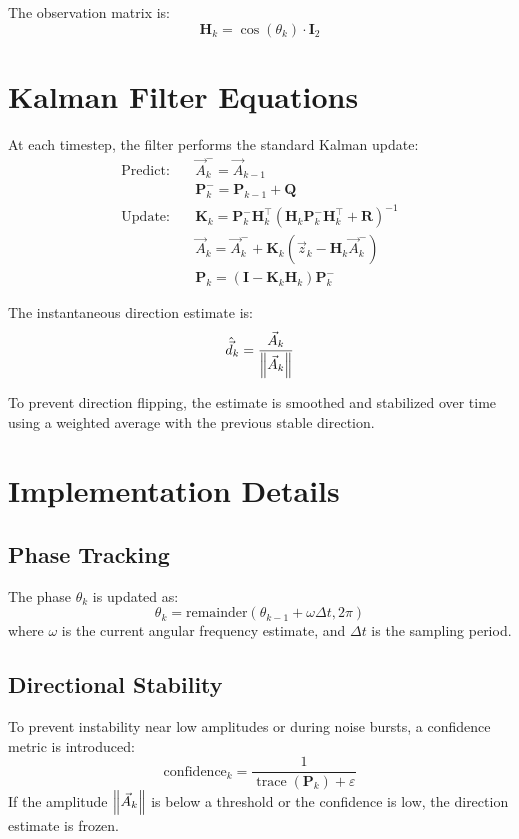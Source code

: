 \documentclass[12pt]{article}
\begin{document}
The observation matrix is:
\[
\mathbf{H}_k = \cos(\theta_k) \cdot \mathbf{I}_2
\]

\section{Kalman Filter Equations}

At each timestep, the filter performs the standard Kalman update:
\begin{align*}
\text{Predict:} \quad & \vec{A}_k^- = \vec{A}_{k-1} \\
& \mathbf{P}_k^- = \mathbf{P}_{k-1} + \mathbf{Q} \\
\text{Update:} \quad & \mathbf{K}_k = \mathbf{P}_k^- \mathbf{H}_k^\top \left( \mathbf{H}_k \mathbf{P}_k^- \mathbf{H}_k^\top + \mathbf{R} \right)^{-1} \\
& \vec{A}_k = \vec{A}_k^- + \mathbf{K}_k \left( \vec{z}_k - \mathbf{H}_k \vec{A}_k^- \right) \\
& \mathbf{P}_k = (\mathbf{I} - \mathbf{K}_k \mathbf{H}_k) \mathbf{P}_k^-
\end{align*}

The instantaneous direction estimate is:
\[
\hat{\vec{d}}_k = \frac{\vec{A}_k}{\norm{\vec{A}_k}}
\]

To prevent direction flipping, the estimate is smoothed and stabilized over time using a weighted average with the previous stable direction.

\section{Implementation Details}

\subsection{Phase Tracking}
The phase \( \theta_k \) is updated as:
\[
\theta_k = \text{remainder}(\theta_{k-1} + \omega \Delta t, 2\pi)
\]
where \( \omega \) is the current angular frequency estimate, and \( \Delta t \) is the sampling period.

\subsection{Directional Stability}
To prevent instability near low amplitudes or during noise bursts, a confidence metric is introduced:
\[
\text{confidence}_k = \frac{1}{\operatorname{trace}(\mathbf{P}_k) + \varepsilon}
\]
If the amplitude \( \norm{\vec{A}_k} \) is below a threshold or the confidence is low, the direction estimate is frozen.
\end{document}
